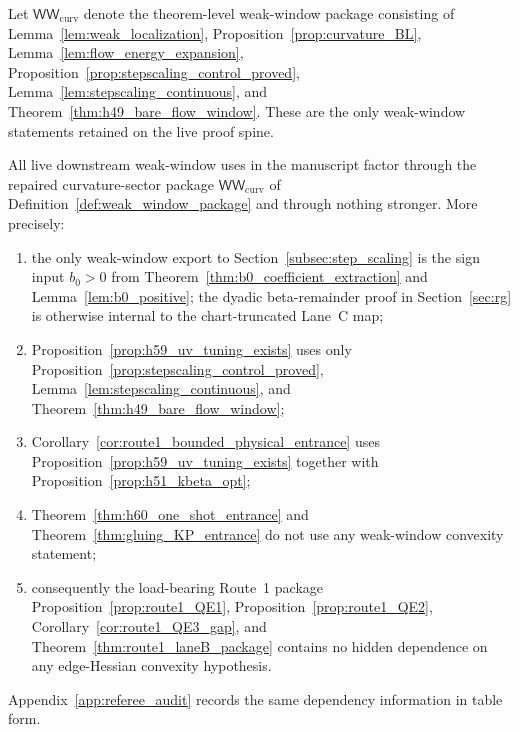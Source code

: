 \begin{definition}\label{def:weak_window_package}
Let $\mathsf{WW}_{\mathrm{curv}}$ denote the theorem-level weak-window package consisting of
Lemma~\ref{lem:weak_localization}, Proposition~\ref{prop:curvature_BL},
Lemma~\ref{lem:flow_energy_expansion}, Proposition~\ref{prop:stepscaling_control_proved},
Lemma~\ref{lem:stepscaling_continuous}, and Theorem~\ref{thm:h49_bare_flow_window}.
These are the only weak-window statements retained on the live proof spine.
\end{definition}

\begin{theorem}\label{thm:weak_window_sufficiency}
All live downstream weak-window uses in the manuscript factor through the repaired curvature-sector package
$\mathsf{WW}_{\mathrm{curv}}$ of Definition~\ref{def:weak_window_package} and through nothing stronger.
More precisely:
\begin{enumerate}[leftmargin=*]
\item the only weak-window export to Section~\ref{subsec:step_scaling} is the sign input $b_0>0$ from Theorem~\ref{thm:b0_coefficient_extraction} and Lemma~\ref{lem:b0_positive}; the dyadic beta-remainder proof in Section~\ref{sec:rg} is otherwise internal to the chart-truncated Lane~C map;
\item Proposition~\ref{prop:h59_uv_tuning_exists} uses only Proposition~\ref{prop:stepscaling_control_proved}, Lemma~\ref{lem:stepscaling_continuous}, and Theorem~\ref{thm:h49_bare_flow_window};
\item Corollary~\ref{cor:route1_bounded_physical_entrance} uses Proposition~\ref{prop:h59_uv_tuning_exists} together with Proposition~\ref{prop:h51_kbeta_opt};
\item Theorem~\ref{thm:h60_one_shot_entrance} and Theorem~\ref{thm:gluing_KP_entrance} do not use any weak-window convexity statement;
\item consequently the load-bearing Route~1 package Proposition~\ref{prop:route1_QE1}, Proposition~\ref{prop:route1_QE2}, Corollary~\ref{cor:route1_QE3_gap}, and Theorem~\ref{thm:route1_laneB_package} contains no hidden dependence on any edge-Hessian convexity hypothesis.
\end{enumerate}
Appendix~\ref{app:referee_audit} records the same dependency information in table form.
\end{theorem}


